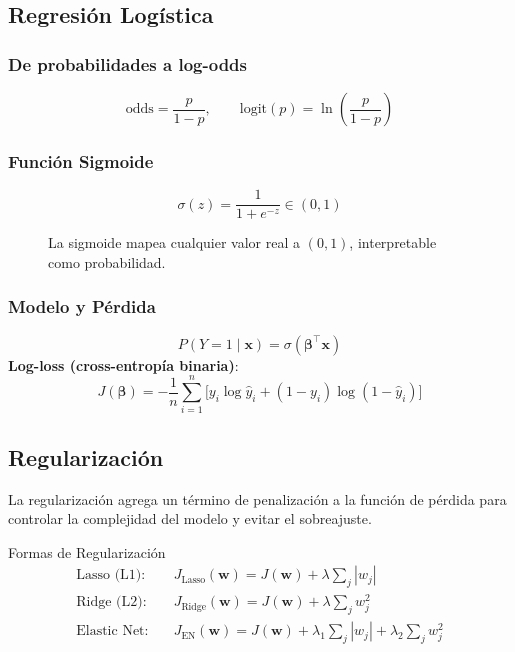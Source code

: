 \documentclass[12pt, a4paper]{article}
\begin{document}
\subsection{Regresión Logística}

\subsubsection{De probabilidades a log-odds}
\[
  \text{odds} = \frac{p}{1-p}, \qquad
  \text{logit}(p) = \ln\!\left(\frac{p}{1-p}\right)
\]

\subsubsection{Función Sigmoide}
\[
  \sigma(z) = \frac{1}{1+e^{-z}} \in (0,1)
\]

\begin{figure}[H]
\centering
{}
\caption{La sigmoide mapea cualquier valor real a $(0,1)$, interpretable como probabilidad.}
\end{figure}

\subsubsection{Modelo y Pérdida}
\[
  P(Y=1\mid\mathbf{x}) = \sigma(\bm{\beta}^\top\mathbf{x})
\]
\textbf{Log-loss (cross-entropía binaria)}:
\[
  J(\bm{\beta}) = -\frac{1}{n}\sum_{i=1}^{n}
  \bigl[y_i\log\hat{y}_i + (1-y_i)\log(1-\hat{y}_i)\bigr]
\]

\subsection{Regularización}

La regularización agrega un término de penalización a la función de pérdida para
controlar la complejidad del modelo y evitar el sobreajuste.

\begin{defbox}{Formas de Regularización}
\begin{align}
  \text{Lasso (L1):} \quad   &J_{\text{Lasso}}(\mathbf{w}) = J(\mathbf{w}) + \lambda\sum_j |w_j| \\[4pt]
  \text{Ridge (L2):} \quad   &J_{\text{Ridge}}(\mathbf{w}) = J(\mathbf{w}) + \lambda\sum_j w_j^2 \\[4pt]
  \text{Elastic Net:} \quad  &J_{\text{EN}}(\mathbf{w}) = J(\mathbf{w})
    + \lambda_1\sum_j|w_j| + \lambda_2\sum_j w_j^2
\end{align}
\end{defbox}
\end{document}
